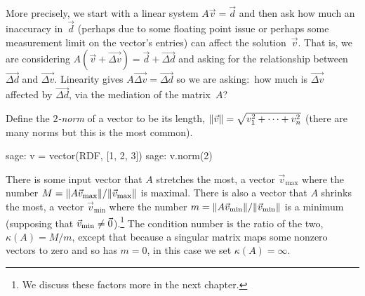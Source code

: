 More precisely, we start with a linear system 
$A\vec{v}=\vec{d}$
and then ask how much an inaccuracy in~$\vec{d}$ (perhaps due to some
floating point issue or perhaps some measurement limit on the vector's entries) 
can affect the solution~$\vec{v}$.
That is, we are considering
$A(\vec{v}+\vec{\Delta v})=\vec{d}+\vec{\Delta d}$
and asking for the relationship between $\vec{\Delta d}$ and $\vec{\Delta v}$.
Linearity gives $A\vec{\Delta v}=\vec{\Delta d}$ so we are
asking:~how much is $\vec{\Delta v}$ affected by $\vec{\Delta d}$, via
the mediation of the matrix~$A$?

Define the \textit{$2$-norm} of a vector to be 
its length,
  $\lVert\vec{v}\rVert=\sqrt{v_1^2+\cdots+v_n^2}$
(there are many norms but this is the most common).
\begin{sagecommandline}
sage: v = vector(RDF, [1, 2, 3])
sage: v.norm(2)
\end{sagecommandline}
There is some input vector that $A$ stretches
the most, a vector $\vec{v}_{\text{max}}$
where the number $M=\lVert A\vec{v}_{\text{max}}\rVert/\lVert\vec{v}_{\text{max}}\rVert$ 
is maximal.
There is also a vector that $A$ shrinks the most, a
vector $\vec{v}_{\text{min}}$ 
where the number
$m=\lVert A\vec{v}_{\text{min}}\rVert/\lVert\vec{v}_{\text{min}}\rVert$ is a minimum 
(supposing that $\vec{v}_{\text{min}}\neq\vec{0}$).\footnote{%
  We discuss these factors more in the next chapter.}
The condition number is the ratio of the two, 
$\kappa(A)=M/m$, except 
that because a singular matrix maps some nonzero vectors to zero and
so has $m=0$, in this case we set $\kappa(A)=\infty$.

